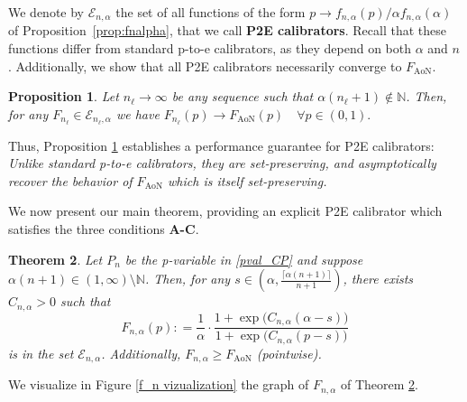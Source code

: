 \documentclass{article}
\theoremstyle{plain}
\newtheorem{theorem}{Theorem}[section]
\newtheorem{proposition}[theorem]{Proposition}
\theoremstyle{definition}
\theoremstyle{remark}
\begin{document}

We denote by $\mathcal{E}_{n,\alpha}$ the set of all functions of the form $p\to f_{n,\alpha}(p)/\alpha f_{n,\alpha}(\alpha)$ of Proposition~\ref{prop:fnalpha}, that we call \textbf{P2E calibrators}. 
Recall that these functions differ from standard p-to-e calibrators, as they depend on both $\alpha$ and $n$. Additionally, we show that all P2E calibrators necessarily converge to $F_{\text{AoN}}$.
\begin{proposition}
\label{prop:convergence_AON}
   Let $n_\ell\to \infty$ be any sequence such that $\alpha(n_\ell+1)\notin \mathbb{N}$. Then, for any $F_{n_\ell}\in\mathcal{E}_{n_\ell,\alpha}$  we have $F_{n_\ell}(p)\xrightarrow{} F_{\mathrm{AoN}}(p) \quad \forall p\in(0,1).$
\end{proposition}
Thus, Proposition \ref{prop:convergence_AON} establishes a performance guarantee for P2E calibrators: \textit{Unlike standard p-to-e calibrators, they are set-preserving, and asymptotically recover the behavior of $F_{\mathrm{AoN}}$ which is itself set-preserving.}

We now present our main theorem, providing an explicit P2E calibrator which satisfies the three conditions \textbf{A-C}.  

\begin{theorem}
\label{main_theorem}
Let $P_n$ be the p-variable in \eqref{pval_CP} and suppose $\alpha(n+1) \in (1,\infty)\setminus \mathbb{N}$. Then, for any $s \in \left(\alpha, \frac{\lceil \alpha(n+1)\rceil}{n+1}\right)$, there exists $C_{n,\alpha} > 0$ such that 
\begin{equation}
\label{final_evalue}
F_{n,\alpha}(p) :
= \frac{1}{\alpha} \cdot 
\frac{1 + \exp\!\big(C_{n,\alpha}(\alpha - s)\big)}
     {1 + \exp\!\big(C_{n,\alpha}(p - s)\big)}
\end{equation}
is in the set $\mathcal{E}_{n,\alpha}$. Additionally, $F_{n,\alpha}\ge F_{\mathrm{AoN}}$ (pointwise).
\end{theorem}
We visualize in Figure \ref{f_n vizualization} the graph of $F_{n,\alpha}$ of Theorem \ref{main_theorem}. 
\end{document}
